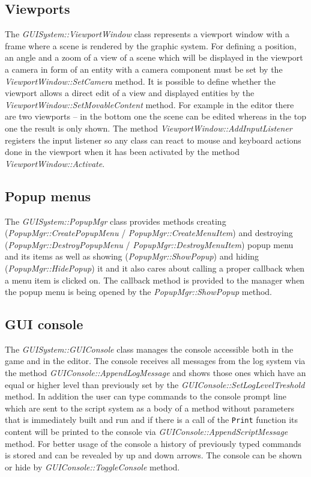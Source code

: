 \subsection{Viewports}

The \emph{GUISystem::ViewportWindow} class represents a viewport window with a frame where a scene is rendered by the graphic system. For defining a position, an angle and a zoom of a view of a scene which will be displayed in the viewport a camera in form of an entity with a camera component must be set by the \emph{ViewportWindow::SetCamera} method. It is possible to define whether the viewport allows a direct edit of a view and displayed entities by the \emph{ViewportWindow::SetMovableContent} method. For example in the editor there are two viewports -- in the bottom one the scene can be edited whereas in the top one the result is only shown. The method \emph{ViewportWindow::AddInputListener} registers the input listener so any class can react to mouse and keyboard actions done in the viewport when it has been activated by the method \emph{ViewportWindow::Activate}.

\subsection{Popup menus}

The \emph{GUISystem::PopupMgr} class provides methods creating (\emph{Popup\-Mgr\-::\-Create\-Popup\-Menu} / \emph{PopupMgr::CreateMenuItem}) and destroying (\emph{PopupMgr::DestroyPopupMenu} / \emph{PopupMgr::DestroyMenuItem}) popup menu and its items as well as showing (\emph{PopupMgr::ShowPopup}) and hiding (\emph{PopupMgr::HidePopup}) it and it also cares about calling a proper callback when a menu item is clicked on. The callback method is provided to the manager when the popup menu is being opened by the \emph{PopupMgr::ShowPopup} method.

\subsection{GUI console}
\label{sub:gui-console}

The \emph{GUISystem::GUIConsole} class manages the console accessible both in the game and in the editor. The console receives all messages from the log system via the method \emph{GUIConsole::AppendLogMessage} and shows those ones which have an equal or higher level than previously set by the \emph{GUIConsole::SetLogLevelTreshold} method. In addition the user can type commands to the console prompt line which are sent to the script system as a body of a method without parameters that is immediately built and run and if there is a call of the \verb/Print/ function its content will be printed to the console via \emph{GUIConsole::AppendScriptMessage} method. For better usage of the console a history of previously typed commands is stored and can be revealed by up and down arrows. The console can be shown or hide by \emph{GUIConsole::ToggleConsole} method.

